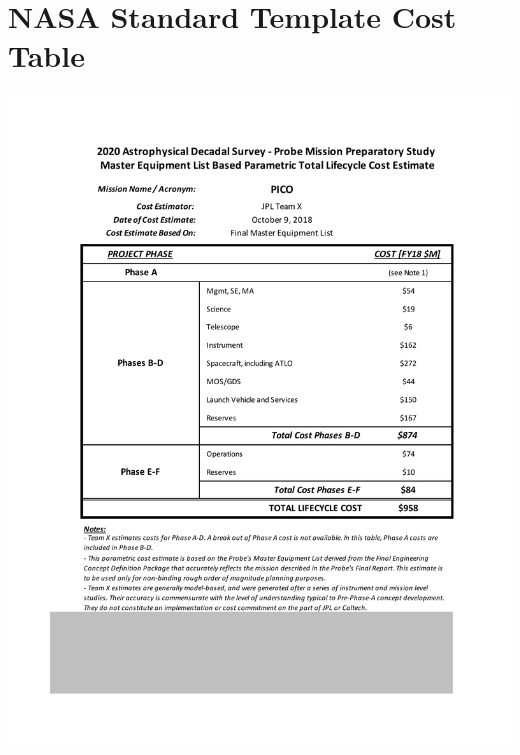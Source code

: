 \newpage


\section*{NASA Standard Template Cost Table}

\begin{centering}
\includegraphics{tables/PICO_Standard_Cost_Table.pdf}
\end{centering}

